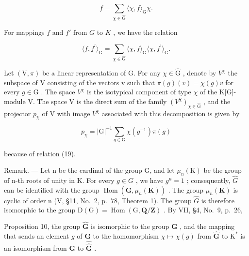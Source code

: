 \[
f = \sum_ {\chi \in \widehat {\mathrm{G}}} \langle \chi , f \rangle_ {\mathrm{G}} \chi .\tag{39}
\]

For mappings \(f\) and \(f'\) from \(G\) to \(K\) , we have the relation

\[
\langle f, f ^ {\prime} \rangle_ {\mathrm{G}} = \sum_ {\chi \in \widehat {\mathrm{G}}} \langle \chi , f \rangle_ {\mathrm{G}} \langle \chi , f ^ {\prime} \rangle_ {\mathrm{G}}.\tag{40}
\]

Let \((\mathrm{V},\pi)\) be a linear representation of G. For any \(\chi\in\widehat{\mathrm{G}}\) , denote by \(V^{\chi}\) the subspace of V consisting of the vectors v such that \(\pi(g)(v)=\chi(g)v\) for every \(g\in\mathrm{G}\) . The space \(V^{\chi}\) is the isotypical component of type \(\chi\) of the K{[}G{]}-module V. The space V is the direct sum of the family \((V^{\chi})_{\chi\in\widehat{\mathrm{G}}}\) , and the projector \(p_{\chi}\) of V with image \(V^{\chi}\) associated with this decomposition is given by

\[
p _ {\chi} = | \mathrm{G} | ^ {- 1} \sum_ {g \in \mathrm{G}} \chi (g ^ {- 1}) \pi (g)\tag{41}
\]

because of relation (19).

Remark. --- Let n be the cardinal of the group G, and let \(\mu_{n}(\mathrm{K})\) be the group of n-th roots of unity in K. For every \(g \in G\) , we have \(g^{n} = 1\) ; consequently, \(\widehat{G}\) can be identified with the group \(\operatorname{Hom}(\mathbf{G}, \mu_{n}(\mathbf{K}))\) . The group \(\mu_{n}(\mathbf{K})\) is cyclic of order n (V, §11, No.~2, p.~78, Theorem 1). The group \(\widehat{G}\) is therefore isomorphic to the group \(\mathrm{D}(\mathrm{G}) = \operatorname{Hom}(\mathrm{G}, \mathbf{Q}/\mathbf{Z})\) . By VII, §4, No.~9, p.~26,

Proposition 10, the group \(\widehat{\mathbf{G}}\) is isomorphic to the group \(\mathbf{G}\) , and the mapping that sends an element \(g\) of \(\mathbf{G}\) to the homomorphism \(\chi \mapsto \chi(g)\) from \(\widehat{\mathbf{G}}\) to \(\mathrm{K}^*\) is an isomorphism from \(\mathbf{G}\) to \(\widehat{\widehat{\mathbf{G}}}\) .
